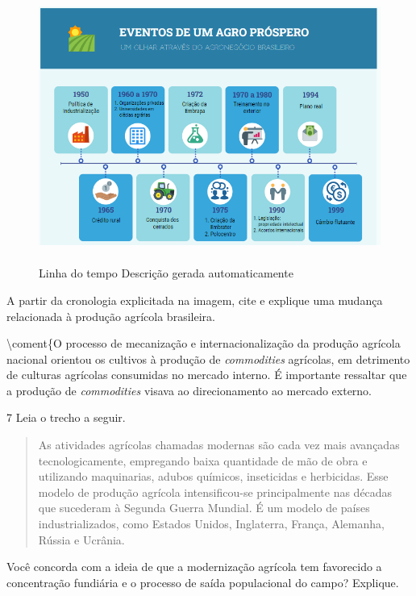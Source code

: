 \begin{figure}
\centering
\includegraphics[width=5.04002in,height=3.51806in]{./imgSAEB_9_CHUM6/media/image3.png}
\caption{Linha do tempo Descrição gerada automaticamente}
\end{figure}

A partir da cronologia explicitada na imagem, cite e explique uma
mudança relacionada à produção agrícola brasileira.

\textbackslash{}coment\{O processo de mecanização e internacionalização
da produção agrícola nacional orientou os cultivos à produção de
\emph{commodities} agrícolas, em detrimento de culturas agrícolas
consumidas no mercado interno. É importante ressaltar que a produção de
\emph{commodities} visava ao direcionamento ao mercado externo.

\num{7} Leia o trecho a seguir.

\begin{quote}
As atividades agrícolas chamadas modernas são cada vez mais avançadas
tecnologicamente, empregando baixa quantidade de mão de obra e
utilizando maquinarias, adubos químicos, inseticidas e herbicidas. Esse
modelo de produção agrícola intensificou-se principalmente nas décadas
que sucederam à Segunda Guerra Mundial. É um modelo de países
industrializados, como Estados Unidos, Inglaterra, França, Alemanha,
Rússia e Ucrânia.
\end{quote}


Você concorda com a ideia de que a modernização agrícola tem favorecido
a concentração fundiária e o processo de saída populacional do campo?
Explique.

